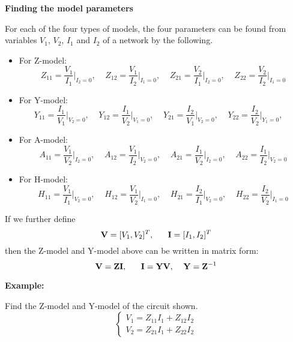\documentclass{article}
\begin{document}
{\bf Finding the model parameters}

For each of the four types of models, the four parameters can be found
from variables $V_1$, $V_2$, $I_1$ and $I_2$ of a network by the following.
\begin{itemize}
\item For Z-model:
  \begin{equation}
    Z_{11}=\frac{V_1}{I_1}\bigg|_{I_2=0},\;\;\;\;
    Z_{12}=\frac{V_1}{I_2}\bigg|_{I_1=0},\;\;\;\;
    Z_{21}=\frac{V_2}{I_1}\bigg|_{I_2=0},\;\;\;\;
    Z_{22}=\frac{V_2}{I_2}\bigg|_{I_1=0}
  \end{equation}
\item For Y-model:
  \begin{equation}
    Y_{11}=\frac{I_1}{V_1}\bigg|_{V_2=0},\;\;\;\;
    Y_{12}=\frac{I_1}{V_2}\bigg|_{V_1=0},\;\;\;\;
    Y_{21}=\frac{I_2}{V_1}\bigg|_{V_2=0},\;\;\;\;
    Y_{22}=\frac{I_2}{V_2}\bigg|_{Y_1=0},\;\;\;\;
  \end{equation}
\item For A-model:
  \begin{equation}
    A_{11}=\frac{V_1}{V_2}\bigg|_{I_2=0},\;\;\;\;
    A_{12}=\frac{V_1}{I_2}\bigg|_{V_2=0},\;\;\;\;
    A_{21}=\frac{I_1}{V_2}\bigg|_{I_2=0},\;\;\;\;
    A_{22}=\frac{I_1}{I_2}\bigg|_{V_2=0}
  \end{equation}
\item For H-model:
  \begin{equation}
    H_{11}=\frac{V_1}{I_1}\bigg|_{V_2=0},\;\;\;\;
    H_{12}=\frac{V_1}{V_2}\bigg|_{I_1=0},\;\;\;\;
    H_{21}=\frac{I_2}{I_1}\bigg|_{V_2=0},\;\;\;\;
    H_{22}=\frac{I_2}{V_2}\bigg|_{I_1=0}
  \end{equation}
\end{itemize}

If we further define
\begin{equation}
  {\bf V}=[V_1, V_2]^T,\;\;\;\;\;\;{\bf I}=[I_1, I_2]^T	
\end{equation}
then the Z-model and Y-model above can be written in matrix form:
\begin{equation}
  {\bf V}={\bf Z} {\bf I},\;\;\;\;\;\;
  {\bf I}={\bf Y} {\bf V},\;\;\;\;{\bf Y}={\bf Z}^{-1}		
\end{equation}

{\bf Example: } 


Find the Z-model and Y-model of the circuit shown.
\begin{equation}
  \left\{ \begin{array}{l} V_1=Z_{11}I_1+Z_{12}I_2 \\
    V_2=Z_{21}I_1+Z_{22}I_2 \end{array} \right.
\end{equation}
\end{document}
